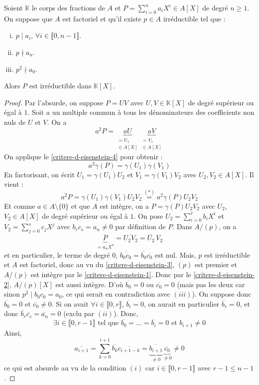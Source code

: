 	\begin{theorem}
		\label{critere-d-eisenstein-5}
		Soient $\mathbb{K}$ le corps des fractions de $A$ et $P = \sum_{i=0}^n a_i X^i \in A[X]$ de degré $n \geq 1$. On suppose que $A$ est factoriel et qu'il existe $p \in A$ irréductible tel que :
		\begin{enumerate}[(i)]
			\item $p \mid a_i$, $\forall i \in \llbracket 0, n-1 \rrbracket$.
			\item $p \nmid a_n$.
			\item $p^2 \nmid a_0$.
		\end{enumerate}
		Alors $P$ est irréductible dans $\mathbb{K}[X]$.
	\end{theorem}

	\begin{proof}
		Par l'absurde, on suppose $P = UV$ avec $U, V \in \mathbb{K}[X]$ de degré supérieur ou égal à $1$. Soit $a$ un multiple commun à tous les dénominateurs des coefficients non nuls de $U$ et $V$. On a
		\[ a^2 P = \underbrace{a U}_{\substack{= U_1 \\ \in A[X]}} \underbrace{a V}_{\substack{= V_1 \\ \in A[X]}} \]
		On applique le \cref{critere-d-eisenstein-4} pour obtenir :
		\[ a^2 \gamma(P) = \gamma(U_1) \gamma(V_1) \tag{$*$} \]
		En factorisant, on écrit $U_1 = \gamma(U_1) U_2$ et $V_1 = \gamma(V_1) V_2$ avec $U_2, V_2 \in A[X]$. Il vient :
		\[ a^2 P = \gamma(U_1) \gamma(V_1) U_2 V_2 \overset{(*)}{=} a^2 \gamma(P) U_2 V_2 \]
		Et comme $a \in A \setminus \{ 0 \}$ et que $A$ est intègre, on a $P = \gamma(P) U_2 V_2$ avec $U_2$, $V_2 \in A[X]$ de degré supérieur ou égal à $1$.
		\newpar
		On pose $U_2 = \sum_{i=0}^r b_i X^i$ et $V_2 = \sum_{j=0}^s c_j X^j$ avec $b_r c_s = a_n \neq 0$ par définition de $P$. Dans $A/(p)$, on a
		\[ \underbrace{\overline{P}}_{= \overline{a_n} X^n} = \overline{U_2 V_2} = \overline{U_2} \, \overline{V_2} \]
		et en particulier, le terme de degré $0$, $\overline{b_0 c_0} = \overline{b_0} \overline{c_0}$ est nul. Mais, $p$ est irréductible et $A$ est factoriel, donc au vu du \cref{critere-d-eisenstein-3}, $(p)$ est premier et $A/(p)$ est intègre par le \cref{critere-d-eisenstein-1}. Donc par le \cref{critere-d-eisenstein-2}, $A/(p)[X]$ est aussi intègre. D'où $\overline{b_0} = 0$ ou $\overline{c_0} = 0$ (mais pas les deux car sinon $p^2 \mid b_0 c_0 = a_0$, ce qui serait en contradiction avec $(iii)$).
		\newpar
		On suppose donc $\overline{b_0} = 0$ et $\overline{c_0} \neq 0$. Si on avait $\forall i \in \llbracket 0, r \rrbracket$, $\overline{b_i} = 0$, on aurait en particulier $\overline{b_r} = 0$, et donc $\overline{b_r} \overline{c_s} = \overline{a_n} = 0$ (exclu par $(ii)$). Donc,
		\[ \exists i \in \llbracket 0, r-1 \rrbracket \text{ tel que } \overline{b_0} = \dots = \overline{b_i} = 0 \text{ et } b_{i+1} \neq 0 \]
		Ainsi,
		\[ \overline{a_{i+1}} = \sum_{k=0}^{i+1} \overline{b_k} \overline{c_{i+1-k}} = \underbrace{\overline{b_{i+1}}}_{\neq 0} \underbrace{\overline{c_0}}_{\neq 0} \neq 0 \]
		ce qui est absurde au vu de la condition $(i)$ car $i \in \llbracket 0, r-1 \rrbracket$ avec $r-1 \leq n-1$.
	\end{proof}

